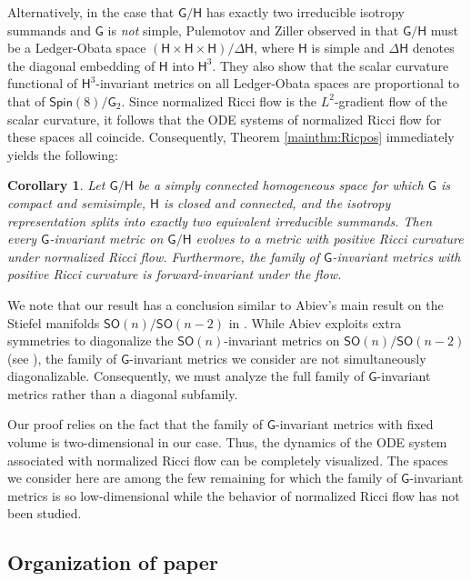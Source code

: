 \documentclass{amsart}
\numberwithin{equation}{section}
\theoremstyle{plain}
\newtheorem{corollaryresult}[result]{Corollary}
\theoremstyle{definition}
\theoremstyle{remark}
\numberwithin{table}{section}
\newcommand{\gG}{\mathsf{G}}
\newcommand{\gH}{\mathsf{H}}
\newcommand{\SO}{\mathsf{SO}}
\newcommand{\Spin}{\mathsf{Spin}}
\begin{document}
Alternatively, in the case that $\gG/\gH$ has exactly two irreducible isotropy summands and $\gG$ is \textit{not} simple, Pulemotov and Ziller observed in \cite[Section 5.2]{PulemotovZiller21preprint} that $\gG/\gH$ must be a Ledger-Obata space $(\gH\times \gH\times \gH)/\Delta \gH$, where $\gH$ is simple and $\Delta \gH$ denotes the diagonal embedding of $\gH$ into $\gH^3$. 
They also show that the scalar curvature functional of $\gH^3$-invariant metrics on all Ledger-Obata spaces are proportional to that of $\Spin(8)/\gG_2$.
Since normalized Ricci flow is the $L^2$-gradient flow of the scalar curvature, it follows that the ODE systems of normalized Ricci flow for these spaces all coincide. 
Consequently, Theorem \ref*{mainthm:Ricpos} immediately yields the following:

\begin{corollaryresult}\label{cor:LedgerObata}
    Let $\gG/\gH$ be a simply connected homogeneous space for which $\gG$ is compact and semisimple, $\gH$ is closed and connected, and the isotropy representation splits into exactly two equivalent irreducible summands.
    Then every $\gG$-invariant metric on $\gG/\gH$ evolves to a metric with positive Ricci curvature under normalized Ricci flow.
    Furthermore, the family of $\gG$-invariant metrics with positive Ricci curvature is forward-invariant under the flow.
\end{corollaryresult}

We note that our result has a conclusion similar to Abiev's main result on the Stiefel manifolds $\SO(n)/\SO(n-2)$ in \cite{Abiev25b}.
While Abiev exploits extra symmetries to diagonalize the $\SO(n)$-invariant metrics on $\SO(n)/\SO(n-2)$ (see \cite[Section 4]{Kerr98}), the family of $\gG$-invariant metrics we consider are not simultaneously diagonalizable.
Consequently, we must analyze the full family of $\gG$-invariant metrics rather than a diagonal subfamily.

Our proof relies on the fact that the family of $\gG$-invariant metrics with fixed volume is two-dimensional in our case.
Thus, the dynamics of the ODE system associated with normalized Ricci flow can be completely visualized.
The spaces we consider here are among the few remaining for which the family of $\gG$-invariant metrics is so low-dimensional while the behavior of normalized Ricci flow has not been studied.
    
\subsection{Organization of paper}
\end{document}
